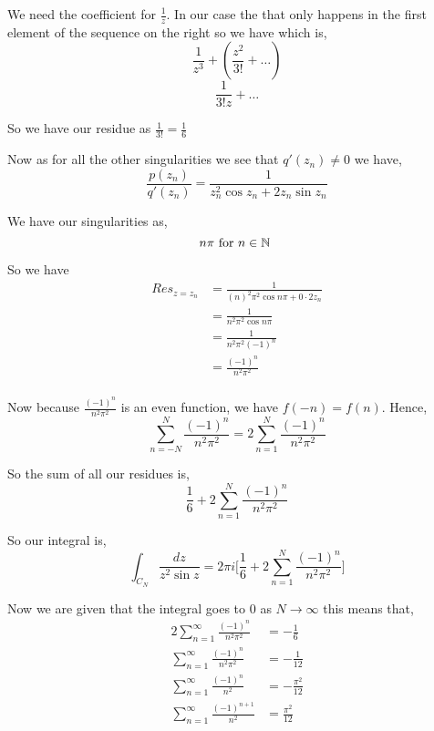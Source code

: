\documentclass[a4paper]{report}
\begin{document}
  We need the coefficient for $\frac{1}{z}$. In our case the that only happens in the first element of the sequence on the right so we have which is, 
  $$ \frac{1}{z^{3}} + (\frac{z^2}{3!} + \dots) $$ 
  $$ \frac{1}{3!z} + \dots $$ 

  So we have our residue as $\frac{1}{3!} = \frac{1}{6}$ 

  Now as for all the other singularities we see that $q'(z_n) \ne 0$ we have,  
  $$ \frac{p(z_n)}{q'(z_n)} = \frac{1}{z_n^2 \cos z_n + 2z_n \sin z_n} $$ 

  We have our singularities as, 
  $$ n\pi  \text { for $n \in \mathbb{N}$ }$$  

  So we have 
  \begin{align*}
      Res_{z = z_n} &= \frac{1}{(n)^2 \pi^2 \cos n \pi + 0 \cdot 2z_n }\\
                    &=  \frac{1}{n^2 \pi^2 \cos n \pi }\\
                    &=  \frac{1}{n^2 \pi^2 (-1)^{n} }\\
                    &=  \frac{(-1)^{n}}{n^2 \pi^2 }\\
  \end{align*}

  Now because $\frac{(-1)^{n}}{n^2\pi^2}$ is an even function, we have $f(-n) = f(n)$. Hence,  
  $$ \sum_{n= -N}^{N} \frac{(-1)^{n}}{n^2\pi^2} = 2 \sum_{n=1}^{N} \frac{(-1)^{n}}{n^2\pi^2} $$

  So the sum of all our residues is, 
  $$ \frac{1}{6}  + 2 \sum_{n=1}^{N} \frac{(-1)^{n}}{n^2\pi^2}$$ 

  So our integral is, 
  $$ \int_{C_N} \frac{dz}{z^2 \sin z} = 2\pi i\bigg [\frac{1}{6}  + 2 \sum_{n=1}^{N} \frac{(-1)^{n}}{n^2\pi^2} \bigg ] $$ 



  Now we are given that the integral goes to $0$ as $N \rightarrow \infty$ this means that, 
  \begin{align*}
      2 \sum_{n=1}^{\infty} \frac{(-1)^{n}}{n^2 \pi^2}  &= - \frac{1}{6}\\
      \sum_{n=1}^{\infty} \frac{(-1)^{n}}{n^2 \pi^2}  &= - \frac{1}{12}\\
      \sum_{n=1}^{\infty} \frac{(-1)^{n}}{n^2 }  &= - \frac{\pi^2}{12}\\
      \sum_{n=1}^{\infty} \frac{(-1)^{n + 1}}{n^2 }  &= \frac{\pi^2}{12}\\
  \end{align*}
\end{document}
